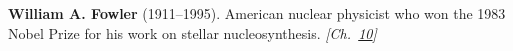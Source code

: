 \nobelphysics \textbf{William A. Fowler} (1911–1995). American nuclear physicist who won the 1983 Nobel Prize for his work on stellar nucleosynthesis. \emph{[Ch.~\hyperref[ch:solarfusionquantumtunneling]{10}]}

